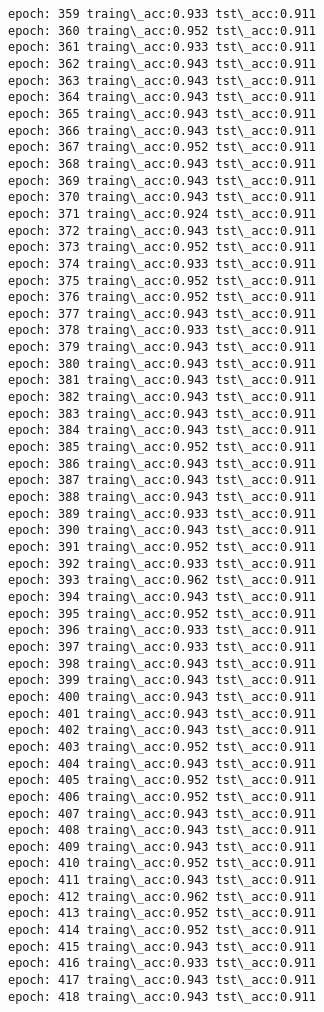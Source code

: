 \documentclass[11pt]{article}
\begin{document}
\begin{Verbatim}[commandchars=\\\{\}]
epoch: 359 traing\_acc:0.933 tst\_acc:0.911
epoch: 360 traing\_acc:0.952 tst\_acc:0.911
epoch: 361 traing\_acc:0.933 tst\_acc:0.911
epoch: 362 traing\_acc:0.943 tst\_acc:0.911
epoch: 363 traing\_acc:0.943 tst\_acc:0.911
epoch: 364 traing\_acc:0.943 tst\_acc:0.911
epoch: 365 traing\_acc:0.943 tst\_acc:0.911
epoch: 366 traing\_acc:0.943 tst\_acc:0.911
epoch: 367 traing\_acc:0.952 tst\_acc:0.911
epoch: 368 traing\_acc:0.943 tst\_acc:0.911
epoch: 369 traing\_acc:0.943 tst\_acc:0.911
epoch: 370 traing\_acc:0.943 tst\_acc:0.911
epoch: 371 traing\_acc:0.924 tst\_acc:0.911
epoch: 372 traing\_acc:0.943 tst\_acc:0.911
epoch: 373 traing\_acc:0.952 tst\_acc:0.911
epoch: 374 traing\_acc:0.933 tst\_acc:0.911
epoch: 375 traing\_acc:0.952 tst\_acc:0.911
epoch: 376 traing\_acc:0.952 tst\_acc:0.911
epoch: 377 traing\_acc:0.943 tst\_acc:0.911
epoch: 378 traing\_acc:0.933 tst\_acc:0.911
epoch: 379 traing\_acc:0.943 tst\_acc:0.911
epoch: 380 traing\_acc:0.943 tst\_acc:0.911
epoch: 381 traing\_acc:0.943 tst\_acc:0.911
epoch: 382 traing\_acc:0.943 tst\_acc:0.911
epoch: 383 traing\_acc:0.943 tst\_acc:0.911
epoch: 384 traing\_acc:0.943 tst\_acc:0.911
epoch: 385 traing\_acc:0.952 tst\_acc:0.911
epoch: 386 traing\_acc:0.943 tst\_acc:0.911
epoch: 387 traing\_acc:0.943 tst\_acc:0.911
epoch: 388 traing\_acc:0.943 tst\_acc:0.911
epoch: 389 traing\_acc:0.933 tst\_acc:0.911
epoch: 390 traing\_acc:0.943 tst\_acc:0.911
epoch: 391 traing\_acc:0.952 tst\_acc:0.911
epoch: 392 traing\_acc:0.933 tst\_acc:0.911
epoch: 393 traing\_acc:0.962 tst\_acc:0.911
epoch: 394 traing\_acc:0.943 tst\_acc:0.911
epoch: 395 traing\_acc:0.952 tst\_acc:0.911
epoch: 396 traing\_acc:0.933 tst\_acc:0.911
epoch: 397 traing\_acc:0.933 tst\_acc:0.911
epoch: 398 traing\_acc:0.943 tst\_acc:0.911
epoch: 399 traing\_acc:0.943 tst\_acc:0.911
epoch: 400 traing\_acc:0.943 tst\_acc:0.911
epoch: 401 traing\_acc:0.943 tst\_acc:0.911
epoch: 402 traing\_acc:0.943 tst\_acc:0.911
epoch: 403 traing\_acc:0.952 tst\_acc:0.911
epoch: 404 traing\_acc:0.943 tst\_acc:0.911
epoch: 405 traing\_acc:0.952 tst\_acc:0.911
epoch: 406 traing\_acc:0.952 tst\_acc:0.911
epoch: 407 traing\_acc:0.943 tst\_acc:0.911
epoch: 408 traing\_acc:0.943 tst\_acc:0.911
epoch: 409 traing\_acc:0.943 tst\_acc:0.911
epoch: 410 traing\_acc:0.952 tst\_acc:0.911
epoch: 411 traing\_acc:0.943 tst\_acc:0.911
epoch: 412 traing\_acc:0.962 tst\_acc:0.911
epoch: 413 traing\_acc:0.952 tst\_acc:0.911
epoch: 414 traing\_acc:0.952 tst\_acc:0.911
epoch: 415 traing\_acc:0.943 tst\_acc:0.911
epoch: 416 traing\_acc:0.933 tst\_acc:0.911
epoch: 417 traing\_acc:0.943 tst\_acc:0.911
epoch: 418 traing\_acc:0.943 tst\_acc:0.911

\end{Verbatim}
\end{document}
